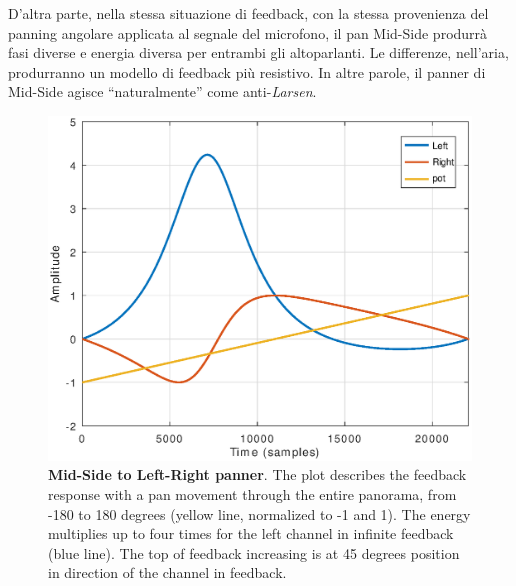 D'altra parte, nella stessa situazione di feedback, con la stessa provenienza
del panning angolare applicata al segnale del microfono, il pan Mid-Side
produrrà fasi diverse e energia diversa per entrambi gli altoparlanti. Le
differenze, nell'aria, produrranno un modello di feedback più resistivo. In
altre parole, il panner di Mid-Side agisce “naturalmente” come anti-\emph{Larsen}.


\begin{figure}[t]
\centering
\includegraphics[width=1\columnwidth]{CAPITOLI/1000/IMG/mspanlrfbpot}
\caption{\textbf{Mid-Side to Left-Right panner}. The plot describes the feedback
response with a pan movement through the entire panorama, from -180 to 180
degrees (yellow line, normalized to -1 and 1). The energy multiplies up to four
times for the left channel in infinite feedback (blue line). The top of feedback
increasing is at 45 degrees position in direction of the channel in feedback.}
\label{fig:mspanlrfb}
\end{figure}
